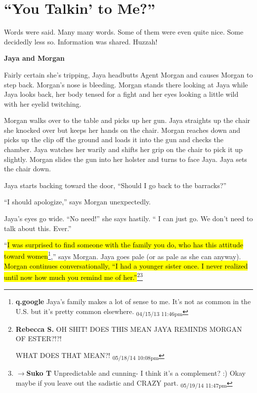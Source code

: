 \setcounter{chapter}{ 18 }
\chapter{\textbf{``You Talkin' to Me?''} }








Words were said.  Many many words.  Some of them were even quite nice.  Some decidedly less so.  Information was shared.  Huzzah!



\noindent\hrulefill





\textbf{Jaya and Morgan}



Fairly certain she's tripping, Jaya headbutts Agent Morgan and causes Morgan to step back.  Morgan's nose is bleeding.  Morgan stands there looking at Jaya while Jaya looks back, her body tensed for a fight and her eyes looking a little wild with her eyelid twitching.



Morgan walks over to the table and picks up her gun.  Jaya straights up the chair she knocked over but keeps her hands on the chair.  Morgan reaches down and picks up the clip off the ground and loads it into the gun and checks the chamber.  Jaya watches her warily and shifts her grip on the chair to pick it up slightly.  Morgan slides the gun into her holster and turns to face Jaya.  Jaya sets the chair down.



Jaya starts backing toward the door, ``Should I go back to the barracks?''

``I should apologize,'' says Morgan unexpectedly.

Jaya's eyes go wide.  ``No need!'' she says hastily. `` I can just go.  We don't need to talk about this.  Ever.''

``\hl{I was surprised to find someone with the family you do, who has this attitude toward women}\footnote{\textbf{q.google }Jaya's family makes a lot of sense to me.  It's not as common in the U.S. but it's pretty common elsewhere. \textsubscript{04/15/13 11:46pm}},'' says Morgan.  Jaya goes pale (or as pale as she can anyway).  \hl{Morgan continues conversationally, ``I had a younger sister once.  I never realized until now how much you remind me of her.''}\footnote{\textbf{Rebecca S. }OH SHIT! 
DOES THIS MEAN JAYA REMINDS MORGAN OF ESTER?!?!

WHAT DOES THAT MEAN?! \textsubscript{05/18/14 10:08pm}}\footnote{$\rightarrow$\textbf{Suko T }Unpredictable and cunning- I think it's a complement? :)  Okay maybe if you leave out the sadistic and CRAZY part. \textsubscript{05/19/14 11:47pm}}

